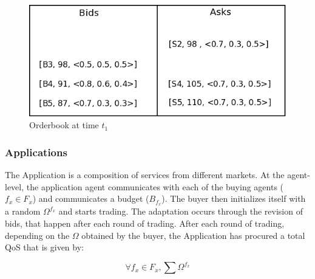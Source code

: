 \documentclass[10pt,journal,compsoc]{IEEEtran}
\begin{document}
\begin{figure}
\includegraphics[scale=0.31]{drawings/orderbook-after-one-pass.png}
\caption{Orderbook at time $t_{1}$}
\label{orderbook-after-one-pass}
\end{figure}

\subsubsection{Applications}
The Application is a composition of services from different markets. At the agent-level, the application agent communicates with each of the buying agents ($f_{x} \in F_{x}$) and communicates a budget ($B_{f_{x}}$). The buyer then initializes itself with a random $\Omega^{f_x}$ and starts trading. The adaptation occurs through the revision of bids, that happen after each round of trading. After each round of trading, depending on the $\Omega$ obtained by the buyer, the Application has procured a total QoS that is given by:
 
 	 \begin{equation}
	  \forall f_{x} \in F_{x}, \sum\Omega^{f_x} \label{eq:total_qa}
	 \end{equation}
\end{document}
